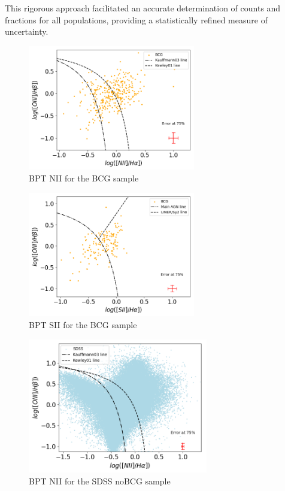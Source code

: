 This rigorous approach facilitated an accurate determination of counts and fractions for all populations, providing a statistically refined measure of uncertainty.
\vspace{2cm}
\begin{figure}[hbtp]
  \centering
  \includegraphics[width=0.65\textwidth]{BCG-NII-V22}
  \caption{BPT NII for the BCG sample }
  \label{4}
\end{figure}

\begin{figure}[hbtp]
  \centering
  \includegraphics[width=0.65\textwidth]{BCG-SII1731-V22}
  \caption{BPT SII for the BCG sample }
  \label{5}
\end{figure}


\begin{figure}[hbtp]
  \centering
  \includegraphics[width=0.7\textwidth]{SDSS-NII-V22}
  \caption{BPT NII for the SDSS noBCG sample }
  \label{6}
\end{figure}

